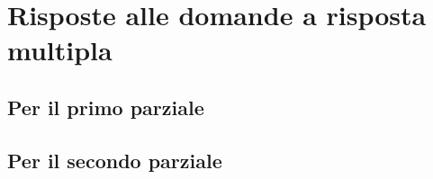 



	\maketitle

	\section*{Risposte alle domande a risposta multipla}

	\subsection*{Per il primo parziale}

	

	\newpage

	\subsection*{Per il secondo parziale}

	


